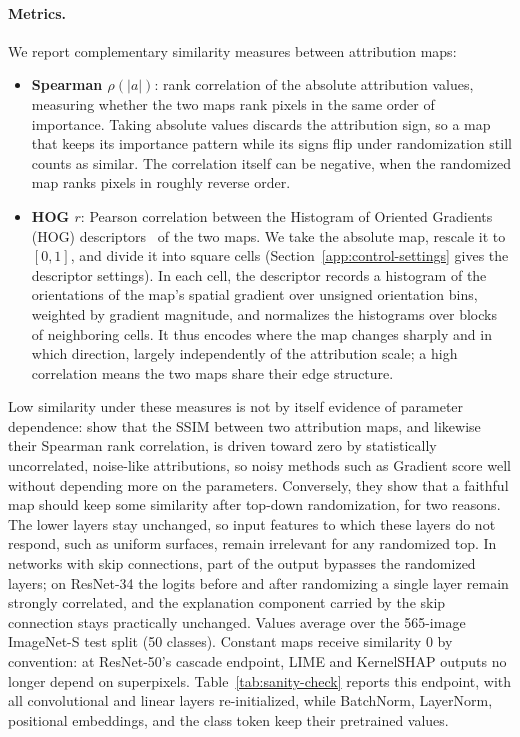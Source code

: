 \paragraph{Metrics.}
We report complementary similarity measures between attribution maps:
\begin{itemize}
    \item \textbf{Spearman $\rho(|a|)$}: rank correlation of the absolute attribution values, measuring whether the two maps rank pixels in the same order of importance. Taking absolute values discards the attribution sign, so a map that keeps its importance pattern while its signs flip under randomization still counts as similar. The correlation itself can be negative, when the randomized map ranks pixels in roughly reverse order.
    \item \textbf{HOG $r$}: Pearson correlation between the Histogram of Oriented Gradients (HOG) descriptors~\parencite{Dalal2005hog} of the two maps. We take the absolute map, rescale it to $[0,1]$, and divide it into square cells (Section~\ref{app:control-settings} gives the descriptor settings). In each cell, the descriptor records a histogram of the orientations of the map's spatial gradient over unsigned orientation bins, weighted by gradient magnitude, and normalizes the histograms over blocks of neighboring cells. It thus encodes where the map changes sharply and in which direction, largely independently of the attribution scale; a high correlation means the two maps share their edge structure.
\end{itemize}
Low similarity under these measures is not by itself evidence of parameter dependence: \textcite{Binder2022shortcomings} show that the SSIM between two attribution maps, and likewise their Spearman rank correlation, is driven toward zero by statistically uncorrelated, noise-like attributions, so noisy methods such as Gradient score well without depending more on the parameters. Conversely, they show that a faithful map should keep some similarity after top-down randomization, for two reasons. The lower layers stay unchanged, so input features to which these layers do not respond, such as uniform surfaces, remain irrelevant for any randomized top. In networks with skip connections, part of the output bypasses the randomized layers; on ResNet-34 the logits before and after randomizing a single layer remain strongly correlated, and the explanation component carried by the skip connection stays practically unchanged. Values average over the 565-image ImageNet-S test split (50 classes). Constant maps receive similarity $0$ by convention: at ResNet-50's cascade endpoint, LIME and KernelSHAP outputs no longer depend on superpixels. Table~\ref{tab:sanity-check} reports this endpoint, with all convolutional and linear layers re-initialized, while BatchNorm, LayerNorm, positional embeddings, and the class token keep their pretrained values.

